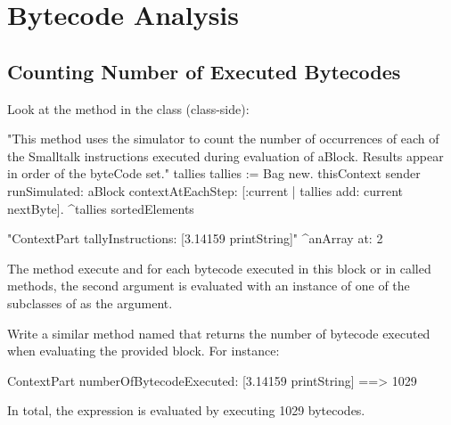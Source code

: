 
\chapter{Bytecode Analysis}


\section{Counting Number of Executed Bytecodes}
Look at the method  in the class  (class-side):
\begin{scode}
	"This method uses the simulator to count the number of occurrences of
	each of the Smalltalk instructions executed during evaluation of aBlock.
	Results appear in order of the byteCode set."
\ttt{|} tallies \ttt{|}
	tallies := Bag new.
	thisContext sender
		runSimulated: aBlock
		contextAtEachStep:
			[:current | tallies add: current nextByte].
	^tallies sortedElements

	"ContextPart tallyInstructions: [3.14159 printString]"
^anArray at: 2\end{scode}

The method  execute  and for each bytecode executed in this block or in called methods, the second argument is evaluated with an instance of one of the subclasses of  as the argument.

Write a similar method named  that returns the number of bytecode executed when evaluating the provided block. For instance:
\begin{scode}
ContextPart numberOfBytecodeExecuted: [3.14159 printString]
==> 1029
\end{scode}

In total, the expression  is evaluated by executing 1029 bytecodes.

%
%        
% 


